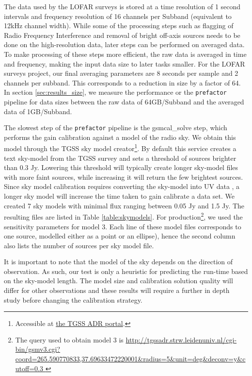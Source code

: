 The data used by the LOFAR surveys is stored at a time resolution of 1 second intervals and frequency resolution of 16 channels per Subband (equivalent to 12kHz channel width). While some of the processing steps such as flagging of Radio Frequency Interference and removal of bright off-axis sources needs to be done on the high-resolution data, later steps can be performed on averaged data. To make processing of these steps more efficient, the raw data is averaged in time and frequency, making the input data size to later tasks smaller. For the LOFAR surveys project, our final averaging parameters are 8 seconds per sample and 2 channels per subband. This corresponds to a reduction in size by a factor of 64. In section \ref{sec:results_size}, we measure the performance or the \texttt{prefactor} pipeline for data sizes between the raw data of 64GB/Subband and the averaged data of 1GB/Subband. 

The slowest step of the \texttt{prefactor} pipeline is the gsmcal\_solve step, which performs the gain calibration against a model of the radio sky. We obtain this model through the TGSS sky model creator\footnote{Accessible at \href{http://tgssadr.strw.leidenuniv.nl/doku.php}{the TGSS ADR portal}.}. By default this service creates a text sky-model from the TGSS survey \citep{tgssadr} and sets a threshold of sources brighter than 0.3 Jy. Lowering this threshold will typically  create longer sky-model files with more faint sources, while increasing it will return the few brightest sources. Since sky model calibration requires converting the sky-model into UV data \citep{dppp}, a longer sky model will increase the time taken to gain calibrate a data set. We created 7 sky models with minimal flux ranging between 0.05 Jy and 1.5 Jy. The resulting files are listed in Table \ref{table:skymodels}. For production\footnote{The query used to obtain model 3 is \url{http://tgssadr.strw.leidenuniv.nl/cgi-bin/gsmv3.cgi?coord=265.590770833,37.69633472220001\&radius=5\&unit=deg\&deconv=y\&cutoff=0.3 }}, we used the sensitivity parameters for model 3. Each line of these model files corresponds to one source, modelled either as a point or an ellipse), hence the second column also lists the number of sources per sky model file.

It is important to note that the model of the sky depends on the direction of observation. As such, our test is only a heuristic for predicting the run-time based on the sky-model length. The model size and calibration solution quality will differ for other observations and these results will require a further in depth study before changing the calibration strategy. 

